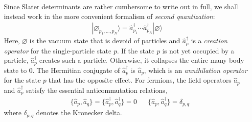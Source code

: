 \documentclass[amsmath, amssymb, aps, floatfix, nofootinbib, preprintnumbers,showpacs, superscriptaddress, twocolumn]{revtex4-1}
\newcommand{\ket}[1]{| #1 \rangle}
\begin{document}
Since Slater determinants are rather cumbersome to write out in full, we shall
instead work in the more convenient formalism of \textit{second quantization}:
\begin{align*}
  \ket{\varnothing_{p_1, \ldots, p_N}} =
  \hat a_{p_1}^\dagger \cdots \hat a_{p_N}^\dagger \ket{\varnothing}
\end{align*}
Here, $\varnothing$ is the vacuum state that is devoid of particles and
$\hat a_p^\dagger$ is a \textit{creation operator} for the single-particle
state $p$.  If the state $p$ is not yet occupied by a particle,
$\hat a_p^\dagger$ creates such a particle.  Otherwise, it collapses the
entire many-body state to $0$.  The Hermitian conjugate of $\hat a_p^\dagger$
is $\hat a_p$, which is an \textit{annihilation operator} for the state $p$
that has the opposite effect.  For fermions, the field operators $\hat a_p$
and $\hat a_p^\dagger$ satisfy the essential anticommutation relations,
\begin{align*}
  &\{\hat a_p, \hat a_q\} = \{\hat a_p^\dagger, \hat a_q^\dagger\} = 0 &
  &\{\hat a_p, \hat a_q^\dagger\} = \delta_{p, q}
\end{align*}
where $\delta_{p, q}$ denotes the Kronecker delta.
\end{document}
